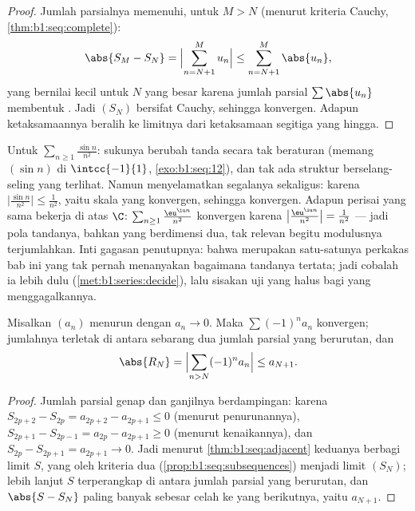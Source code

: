 \begin{proof}
Jumlah parsialnya memenuhi, untuk $M > N$ (menurut kriteria Cauchy,
\cref{thm:b1:seq:complete}):
\[
\abs{S_M - S_N} = \Bigl| \sum_{n=N+1}^{M} u_n \Bigr|
\leq \sum_{n=N+1}^{M} \abs{u_n},
\]
yang bernilai kecil untuk $N$ yang besar karena jumlah parsial $\sum\abs{u_n}$
membentuk . Jadi $(S_N)$ bersifat Cauchy, sehingga konvergen. Adapun
ketaksamaannya beralih ke limitnya dari ketaksamaan segitiga yang hingga.
\end{proof}

\begin{example}\label{ex:b1:series:absexamples}
Untuk $\sum_{n\geq1} \frac{\sin n}{n^2}$: sukunya berubah tanda
secara tak beraturan (memang $(\sin n)$  di $\intcc{-1}{1}$,
\cref{exo:b1:seq:12}), dan tak ada struktur berselang-seling yang
terlihat. Namun  menyelamatkan segalanya sekaligus:
karena $\bigl|\frac{\sin n}{n^2}\bigr| \leq \frac{1}{n^2}$, yaitu
skala yang konvergen, sehingga  konvergen. Adapun perisai yang sama bekerja
di atas $\C$: $\sum_{n\geq1}\frac{\eu^{\iu n}}{n^2}$ konvergen
karena $\bigl|\frac{\eu^{\iu n}}{n^2}\bigr| = \frac{1}{n^2}$
--- jadi pola tandanya, bahkan yang berdimensi dua, tak relevan
begitu modulusnya terjumlahkan. Inti gagasan penutupnya: bahwa  merupakan satu-satunya perkakas bab ini yang tak pernah menanyakan bagaimana
tandanya tertata; jadi cobalah ia lebih dulu
(\cref{met:b1:series:decide}), lalu sisakan uji yang halus
bagi  yang menggagalkannya.
\end{example}

\begin{theorem}\label{thm:b1:series:alternating}
Misalkan $(a_n)$ menurun dengan $a_n \to 0$. Maka  $\sum (-1)^n a_n$ konvergen; jumlahnya terletak di antara sebarang dua
jumlah parsial yang berurutan, dan
\[
\abs{R_N} = \Bigl| \sum_{n > N} (-1)^n a_n \Bigr| \leq a_{N+1} .
\]
\end{theorem}

\begin{proof}
Jumlah parsial genap dan ganjilnya berdampingan: karena $S_{2p+2} - S_{2p} =
a_{2p+2} - a_{2p+1} \leq 0$ (menurut penurunannya), $S_{2p+1} - S_{2p-1} =
a_{2p} - a_{2p+1} \geq 0$ (menurut kenaikannya), dan $S_{2p} - S_{2p+1} =
a_{2p+1} \to 0$. Jadi menurut \cref{thm:b1:seq:adjacent} keduanya berbagi limit
$S$, yang oleh kriteria dua 
(\cref{prop:b1:seq:subsequences}) menjadi limit $(S_N)$;
lebih lanjut $S$ terperangkap di antara jumlah parsial yang berurutan, dan
$\abs{S - S_N}$ paling banyak sebesar celah ke yang berikutnya, yaitu $a_{N+1}$.
\end{proof}

